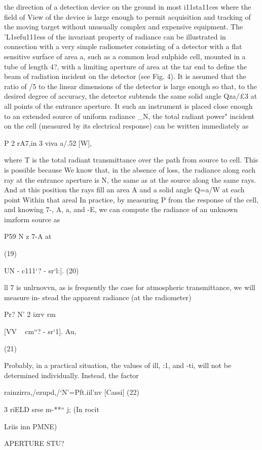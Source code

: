 \begin{refsection}
the direction of a detection device on the ground
in most i11sta11ces where the field of View of the
device is large enough to permit acquisition and
tracking of the moving target without unusually
complex and expensive equipment.
The 'L1sefu111ess of the invariant property of
radiance can be illustrated in connection with a
very simple radiometer consisting of a detector
with a flat sensitive surface of area a, such as a
common lead sulphide cell, mounted in a tube of
length 4?, with a limiting aperture of area at the
tar end to define the beam of radiation incident
on the detector (see Fig. 4). It is assumed that
the ratio of /5 to the linear dimensions of the
detector is large enough so that, to the desired
degree of accuracy, the detector subtends the
same solid angle Qza/£3 at all points of the
entrance aperture. It such an instrument is
placed close enough to an extended source of
uniform radiance _N, the total radiant power"
incident on the cell (measured by its electrical
response) can be written immediately as

P 2 rA7,in 3 viva a/.52 [W],

where T is the total radiant transmittance over
the path from source to cell. This is possible
because We know that, in the absence of loss, the
radiance along each ray at the entrance aperture
is N, the same as at the source along the same
rays. And at this position the rays fill an area A
and a solid angle Q=a/W at each point Within
that areal In practice, by measuring P from the
response of the cell, and knowing 7-, A, a, and -E,
we can compute the radiance of an unknown
imzform source as

P59
N z
7-A at

(19)

UN - c111‘? - sr‘l:]. (20)

ll 7 is unlrnovvn, as is frequently the case for
atmospheric transmittance, we will measure in-
stead the apparent radiance (at the radiometer)

Pr?
N’ 2 izrv rm

[VV ~ cm“? - sr‘1].
Au,

(21)

Probably, in a practical situation, the values of
ill, :1, and -ti, will not be determined individually.
Instead, the factor

rainzirra,/ezupd,/‘N’=Pft.iil’nv [Cassi] (22)

3 riELD srse
m-**“ j; (In rocit

Lriis inn PMNE)

APERTURE STU?


\end{refsection}
